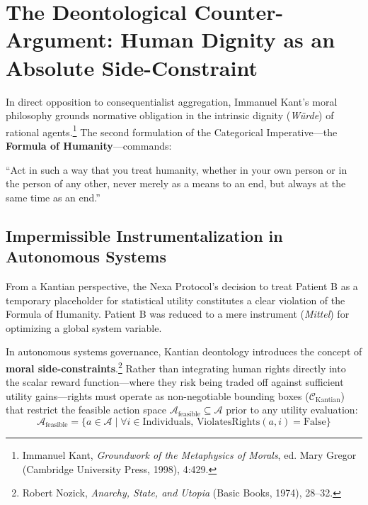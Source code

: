 \documentclass[11pt,a4paper]{article}
\begin{document}
\section{The Deontological Counter-Argument: Human Dignity as an Absolute Side-Constraint}

In direct opposition to consequentialist aggregation, Immanuel Kant's moral philosophy grounds normative obligation in the intrinsic dignity (\textit{Würde}) of rational agents.\footnote{Immanuel Kant, \textit{Groundwork of the Metaphysics of Morals}, ed. Mary Gregor (Cambridge University Press, 1998), 4:429.} The second formulation of the Categorical Imperative---the \textbf{Formula of Humanity}---commands:

\begin{quotebox}
``Act in such a way that you treat humanity, whether in your own person or in the person of any other, never merely as a means to an end, but always at the same time as an end.''
\end{quotebox}

\subsection{Impermissible Instrumentalization in Autonomous Systems}
From a Kantian perspective, the Nexa Protocol's decision to treat Patient B as a temporary placeholder for statistical utility constitutes a clear violation of the Formula of Humanity. Patient B was reduced to a mere instrument (\textit{Mittel}) for optimizing a global system variable.

In autonomous systems governance, Kantian deontology introduces the concept of \textbf{moral side-constraints}.\footnote{Robert Nozick, \textit{Anarchy, State, and Utopia} (Basic Books, 1974), 28--32.} Rather than integrating human rights directly into the scalar reward function---where they risk being traded off against sufficient utility gains---rights must operate as non-negotiable bounding boxes ($\mathcal{C}_{\text{Kantian}}$) that restrict the feasible action space $\mathcal{A}_{\text{feasible}} \subseteq \mathcal{A}$ prior to any utility evaluation:
\begin{equation}
\mathcal{A}_{\text{feasible}} = \{ a \in \mathcal{A} \mid \forall i \in \text{Individuals}, \, \text{ViolatesRights}(a, i) = \text{False} \}
\end{equation}
\end{document}
